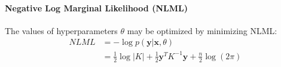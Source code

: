 \documentclass[11pt]{article}
\newcommand{\tb}[1]{\textbf{#1}}
\newcommand{\vx}[0]{\tb{x}}
\newcommand{\vy}[0]{\tb{y}}
\begin{document}
\paragraph{Negative Log Marginal Likelihood (NLML)}
The values of hyperparameters $\theta$ may be optimized by minimizing NLML:
\begin{align*}
	NLML &= -\log p(\vy|\vx,\theta) \\
	&= \frac{1}{2}\log |K| + \frac{1}{2}\vy^TK^{-1}\vy + \frac{n}{2} \log (2\pi)
\end{align*}
\end{document}

